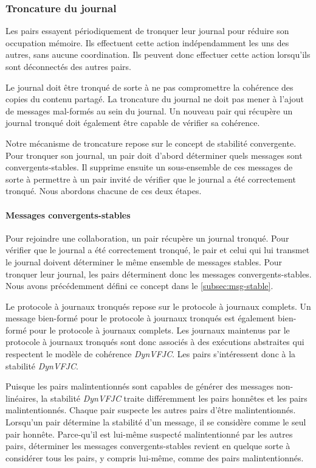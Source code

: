 \subsubsection{Troncature du journal}

Les pairs essayent périodiquement de tronquer leur journal pour réduire son occupation mémoire.
Ils effectuent cette action indépendamment les uns des autres, sans aucune coordination.
Ils peuvent donc effectuer cette action lorsqu'ils sont déconnectés des autres pairs.

Le journal doit être tronqué de sorte à ne pas compromettre la cohérence des copies du contenu partagé.
La troncature du journal ne doit pas mener à l'ajout de messages mal-formés au sein du journal.
Un nouveau pair qui récupère un journal tronqué doit également être capable de vérifier sa cohérence.

Notre mécanisme de troncature repose sur le concept de stabilité convergente.
Pour tronquer son journal, un pair doit d'abord déterminer quels messages sont convergents-stables.
Il supprime ensuite un sous-ensemble de ces messages de sorte à permettre à un pair invité de vérifier que le journal a été correctement tronqué.
Nous abordons chacune de ces deux étapes.

\paragraph{Messages convergents-stables}
Pour rejoindre une collaboration, un pair récupère un journal tronqué.
Pour vérifier que le journal a été correctement tronqué, le pair et celui qui lui transmet le journal doivent déterminer le même ensemble de messages stables.
Pour tronquer leur journal, les pairs déterminent donc les messages convergents-stables.
Nous avons précédemment défini ce concept dans le \autoref{subsec:msg-stable}.

Le protocole à journaux tronqués repose sur le protocole à journaux complets.
Un message bien-formé pour le protocole à journaux tronqués est également bien-formé pour le protocole à journaux complets.
Les journaux maintenus par le protocole à journaux tronqués sont donc associés à des exécutions abstraites qui respectent le modèle de cohérence \emph{DynVFJC}.
Les pairs s'intéressent donc à la stabilité \emph{DynVFJC}.

Puisque les pairs malintentionnés sont capables de générer des messages non-linéaires, la stabilité \emph{DynVFJC} traite différemment les pairs honnêtes et les pairs malintentionnés.
Chaque pair suspecte les autres pairs d'être malintentionnés.
Lorsqu'un pair détermine la stabilité d'un message, il se considère comme le seul pair honnête.
Parce-qu'il est lui-même suspecté malintentionné par les autres pairs, déterminer les messages convergents-stables revient en quelque sorte à considérer tous les pairs, y compris lui-même, comme des pairs malintentionnés.

